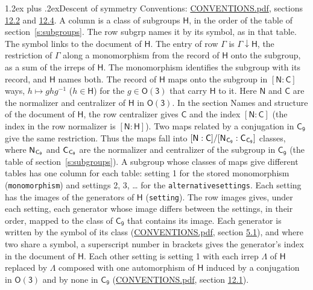 \documentclass[10pt,a4paper]{article}
\makeatletter
\renewcommand\section{\@startsection{section}{1}{\z@}{-3ex plus -1ex minus -.2ex}%
  {1.2ex plus .2ex}{\normalfont\large\sffamily\bfseries\color{parttitle}}}
\numberwithin{equation}{section}
\newcommand{\grp}[1]{\mathsf{#1}}
\newcommand{\grpindex}[2]{[#1 : #2]}
\newcommand{\restr}[2]{#1\!\downarrow#2}
\newcommand{\hairsp}{\mkern1mu}
\makeatother
\begin{document}
\section{Descent of symmetry}\label{s:subduction}
Conventions: \href{../../CONVENTIONS.pdf}{CONVENTIONS.pdf}, sections \href{../../CONVENTIONS.pdf\#conv.12.2}{12.2} and \href{../../CONVENTIONS.pdf\#conv.12.4}{12.4}.
A column is a class of subgroups $\grp{H}$, in the order of the table of section~\ref{s:subgroups}. The row subgrp names it by its symbol, as in that table. The symbol links to the document of $\grp{H}$. The entry of row $\Gamma$ is $\restr{\Gamma}{\grp{H}}$, the restriction of $\Gamma$ along a monomorphism from the record of $\grp{H}$ onto the subgroup, as a sum of the irreps of $\grp{H}$. The monomorphism identifies the subgroup with its record, and $\grp{H}$ names both. \label{n:group.normalizer.o3}\label{n:group.centralizer.o3}The record of $\grp{H}$ maps onto the subgroup in $\grpindex{\grp{N}}{\grp{C}}$ ways, $h \mapsto g h g^{-1}$ ($h \in \grp{H}$) for the $g \in \grp{O(3)}$ that carry $\grp{H}$ to it. Here $\grp{N}$ and $\grp{C}$ are the normalizer and centralizer of $\grp{H}$ in \href{O3.pdf}{$\grp{O(3)}$}. In the section Names and structure of the document of $\grp{H}$, the row centralizer gives $\grp{C}$ and the index $\grpindex{\grp{N}}{\grp{C}}$ (the index in the row normalizer is $\grpindex{\grp{N}}{\grp{H}}$). Two maps related by a conjugation in $\grp{C_{9}}$ give the same restriction. Thus the maps fall into $\grpindex{\grp{N}}{\grp{C}}/\grpindex{\grp{N}_{\hairsp \grp{C_{9}}}}{\grp{C}_{\hairsp \grp{C_{9}}}}$ classes, where $\grp{N}_{\hairsp \grp{C_{9}}}$ and $\grp{C}_{\hairsp \grp{C_{9}}}$ are the normalizer and centralizer of the subgroup in $\grp{C_{9}}$ (the table of section~\ref{s:subgroups}). \label{n:head.setting}A subgroup whose classes of maps give different tables has one column for each table: setting 1 for the stored monomorphism (\texttt{monomorphism}) and settings 2, 3, \dots{} for the \texttt{alternativesettings}. Each setting has the images of the generators of $\grp{H}$ (\texttt{setting}). \label{n:head.images}The row images gives, under each setting, each generator whose image differs between the settings, in their order, mapped to the class of $\grp{C_{9}}$ that contains its image. Each generator is written by the symbol of its class (\href{../../CONVENTIONS.pdf}{CONVENTIONS.pdf}, section \href{../../CONVENTIONS.pdf\#conv.5.1}{5.1}), and where two share a symbol, a superscript number in brackets gives the generator's index in the document of $\grp{H}$. \label{n:irrep.Delta}Each other setting is setting 1 with each irrep $\Lambda$ of $\grp{H}$ replaced by $\Lambda$ composed with one automorphism of $\grp{H}$ induced by a conjugation in \href{O3.pdf}{$\grp{O(3)}$} and by none in $\grp{C_{9}}$ (\href{../../CONVENTIONS.pdf}{CONVENTIONS.pdf}, section \href{../../CONVENTIONS.pdf\#conv.12.1}{12.1}).
\end{document}
